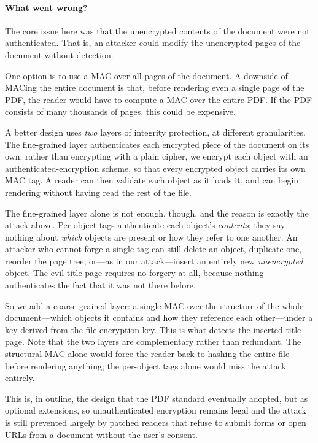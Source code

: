 \paragraph{What went wrong?}
The core issue here was that the unencrypted
contents of the document were not authenticated.
That is, an attacker could modify the
unencrypted pages of the document without detection.

One option is to use a MAC over all pages of the document.
A downside of MACing the entire document is that, before rendering
even a single page of the PDF, the reader would have to compute a MAC
over the entire PDF. If the PDF consists of many thousands of pages,
this could be expensive.

A better design uses \emph{two} layers of integrity protection, at
different granularities.  The fine-grained layer authenticates each
encrypted piece of the document on its own: rather than encrypting with
a plain cipher, we encrypt each object with an authenticated-encryption
scheme, so that every encrypted object carries its own MAC tag.  A
reader can then validate each object as it loads it, and can begin
rendering without having read the rest of the
file.

The fine-grained layer alone is not enough, though, and the reason is
exactly the attack above.  Per-object tags authenticate each object's
\emph{contents}; they say nothing about \emph{which} objects are
present or how they refer to one another.  An attacker who cannot forge
a single tag can still delete an object, duplicate one, reorder the page
tree, or---as in our attack---insert an entirely new
\emph{unencrypted} object.  The evil title page requires no forgery at
all, because nothing authenticates the fact that it was not there
before.

So we add a coarse-grained layer: a single MAC over the structure of
the whole document---which objects it contains and how they reference
each other---under a key derived from the file encryption key.  This is
what detects the inserted title page.  Note that the two layers are
complementary rather than redundant.  The structural MAC alone would
force the reader back to hashing the entire file before rendering
anything; the per-object tags alone would miss the attack entirely.

This is, in outline, the design that the PDF standard eventually
adopted, but as optional extensions, so 
unauthenticated encryption remains legal and the attack is still
prevented largely by patched readers that refuse to submit forms or
open URLs from a document without the user's consent.

